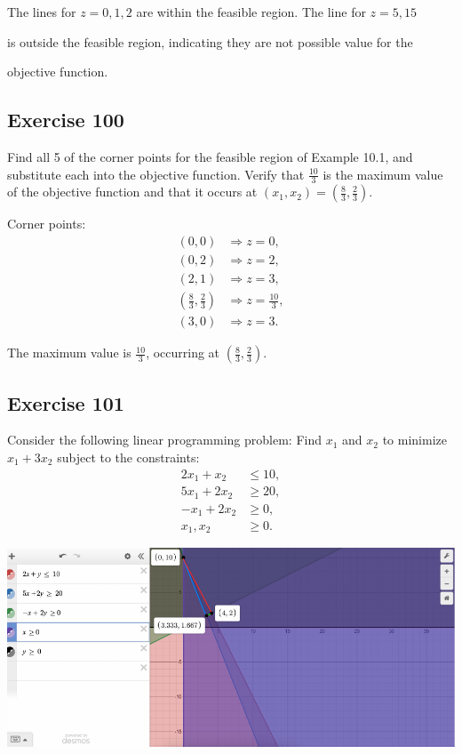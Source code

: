 \documentclass{article}
\begin{document}
The lines for \( z = 0, 1, 2 \) are within the feasible region. The line for \( z = 5, 15 \) 

is outside the feasible region, indicating they are not possible value for the 

objective function.

\subsection*{Exercise 100}
Find all 5 of the corner points for the feasible region of Example 10.1, and substitute each into the objective function. Verify that \( \frac{10}{3} \) is the maximum value of the objective function and that it occurs at \( (x_1, x_2) = \left( \frac{8}{3}, \frac{2}{3} \right) \).

Corner points:
\[
\begin{aligned}
    (0, 0) &\Rightarrow z = 0, \\
    (0, 2) &\Rightarrow z = 2, \\
    (2, 1) &\Rightarrow z = 3, \\
    \left( \frac{8}{3}, \frac{2}{3} \right) &\Rightarrow z = \frac{10}{3}, \\
    (3, 0) &\Rightarrow z = 3.
\end{aligned}
\]

The maximum value is \( \frac{10}{3} \), occurring at \( \left( \frac{8}{3}, \frac{2}{3} \right) \).

\subsection*{Exercise 101}
Consider the following linear programming problem: Find \( x_1 \) and \( x_2 \) to minimize \( x_1 + 3x_2 \) subject to the constraints:
\[
\begin{aligned}
    2x_1 + x_2 &\leq 10, \\
    5x_1 + 2x_2 &\geq 20, \\
    -x_1 + 2x_2 &\geq 0, \\
    x_1, x_2 &\geq 0.
\end{aligned}
\]

\begin{center}
    \includegraphics[width=1.2\textwidth]{Ex101.pdf}
\end{center}
\end{document}
